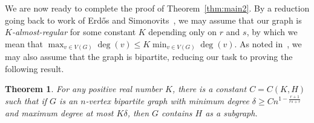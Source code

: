 \documentclass[11pt]{article}
\numberwithin{equation}{section}
\newtheorem{theorem}{\bf Theorem}[section]
\theoremstyle{definition}
\begin{document}
We are now ready to complete the proof of Theorem~\ref{thm:main2}. By a reduction going back to work of Erd\H{o}s and Simonovits~\cite{ES70}, we may assume that our graph is {\it $K$-almost-regular} for some constant $K$ depending only on $r$ and $s$, by which we mean that $\max_{v \in V(G)} \deg(v) \leq K \min_{v \in V(G)} \deg(v)$. As noted in~\cite{CL21}, we may also assume that the graph is bipartite, reducing our task to proving the following result.

\begin{theorem} \label{thm:regular}
	For any positive real number $K$, there is a constant $C=C(K,H)$ such that if $G$ is an $n$-vertex bipartite graph with minimum degree $\delta \geq Cn^{1-\frac{r+1}{rs+r}}$ and maximum degree at most $K\delta$, then $G$ contains $H$ as a subgraph.
\end{theorem}
\end{document}

